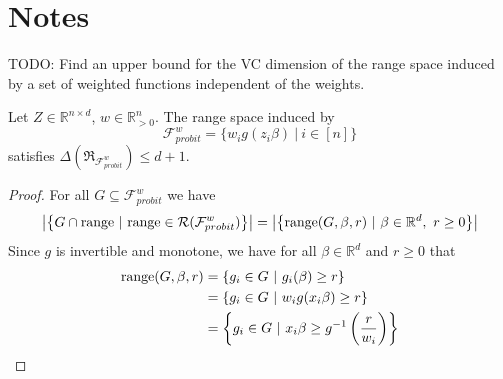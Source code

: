 \section{Notes}

TODO: Find an upper bound for the VC dimension of the range space
induced by a set of weighted functions independent of the weights.

\begin{lemma}
    Let $Z \in \mathbb{R}^{n \times d}$, $w \in \mathbb{R}^{n}_{>0}$.
    The range space induced by
    $$\mathcal{F}^w_{probit} = \{ w_i g(z_i \beta) \ | \ i \in [n] \}$$
    satisfies $\Delta(\mathfrak{R}_{\mathcal{F}^w_{probit}}) \leq d + 1$.
\end{lemma}
\begin{proof}
    For all $G \subseteq \mathcal{F}^w_{probit}$ we have
    \begin{equation*}
        \left| \left\{ G \cap \textup{range} \ | \
        \textup{range} \in \mathcal{R}(\mathcal{F}^w_{probit}) \right\} \right|
        =
        \left| \left\{ \textup{range}(G, \beta, r) \ | \
        \beta \in \mathbb{R}^d, \ r \geq 0 \right\} \right|
    \end{equation*}
    Since $g$ is invertible and monotone, we have for all
    $\beta \in \mathbb{R}^d$ and $r \geq 0$ that
    \begin{align*}
        \textup{range}(G, \beta, r)
         & = \left\{ g_i \in G \ |\ g_i(\beta) \geq r \right\}                                  \\
         & = \left\{ g_i \in G \ |\ w_i g(x_i \beta) \geq r \right\}                            \\
         & = \left\{ g_i \in G \ |\ x_i \beta \geq g^{-1} \left( \frac{r}{w_i} \right) \right\} \\
    \end{align*}
\end{proof}